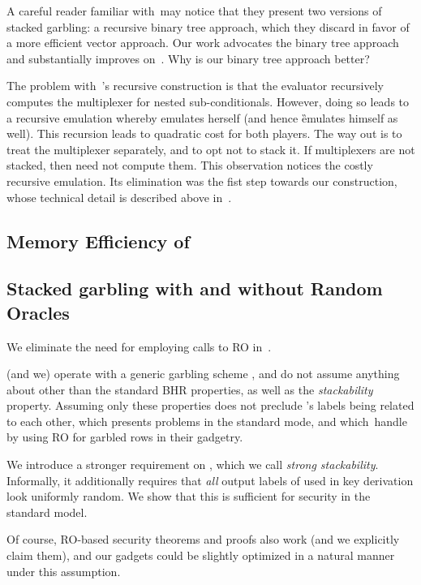 A careful reader familiar with~\HK may notice that they present two versions of stacked garbling: a 
recursive binary tree approach, which they 
discard in favor of a more efficient vector approach.
Our work advocates the binary tree approach and substantially improves on~\HK.
Why is our binary tree approach better?

The problem with~\HK's recursive construction
is that the evaluator \E recursively computes the multiplexer for
nested sub-conditionals.
However, doing so leads to a recursive emulation whereby \E
emulates herself (and hence \G emulates himself as well).
This recursion leads to quadratic cost for both players.
The way out is to treat the multiplexer separately, and to opt not
to stack it.
If multiplexers are not stacked, then \E need not compute them.
This observation notices the costly recursive emulation.  Its elimination was the fist step towards our construction, whose technical detail is described above in~.





\subsection{Memory Efficiency of \ourschemelong}
\label{sec:memoryEfficiency}





\subsection{Stacked garbling with and without Random Oracles}
\label{sec:techOverviewRO}


We eliminate the need for employing calls to RO in~\HK.   

\HK (and we) operate with a generic garbling scheme \underscheme, and do not assume anything about \underscheme other than the standard BHR properties, as well as the {\em stackability} property.  Assuming only  these properties does not preclude \underscheme's labels being related to each other, which presents problems in the standard mode, and which~\HK handle by using RO for garbled rows in their gadgetry.

We introduce a stronger requirement on \underscheme, which we call {\em strong stackability}.  Informally, it additionally requires that {\em all} output labels of \underscheme used in key derivation look uniformly random.  We show that this is sufficient for security in the standard model.

Of course, RO-based security theorems and proofs also work (and we explicitly claim them), and our gadgets could be slightly optimized in a natural manner under this assumption.





